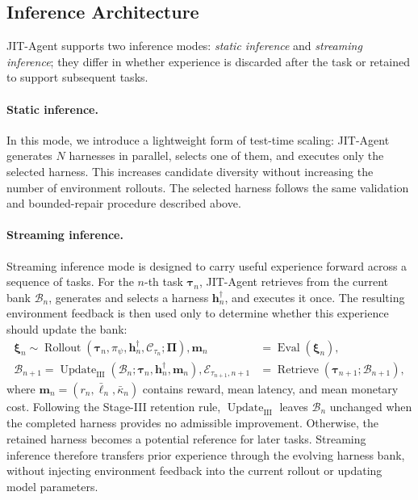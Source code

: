 \documentclass{article}
\newcommand{\ourmethod}{JIT-Agent\xspace}
\begin{document}
\vspace{-0.5em}
\subsection{Inference Architecture}
\vspace{-0.5em}

\ourmethod supports two inference modes: \textit{static inference} and \textit{streaming inference}; they differ in whether experience is discarded after the task or retained to support subsequent tasks.

\vspace{-0.7em}
\paragraph{Static inference.}
In this mode, we introduce a lightweight form of test-time scaling: \ourmethod generates $N$ harnesses in parallel, selects one of them, and executes only the selected harness. This increases candidate diversity without increasing the number of environment rollouts. The selected harness follows the same validation and bounded-repair procedure described above.

\vspace{-0.7em}
\paragraph{Streaming inference.}
Streaming inference mode is designed to carry useful experience forward across a sequence of tasks. For the $n$-th task $\boldsymbol{\tau}_n$, \ourmethod retrieves from the current bank $\mathcal{B}_n$, generates and selects a harness $\mathbf{h}^{\dagger}_n$, and executes it once. The resulting environment feedback is then used only to determine whether this experience should update the bank:
\begin{equation}
\label{eq:streaming_inference}
\begin{aligned}
\boldsymbol{\xi}_{n}
\sim \operatorname{Rollout}(\boldsymbol{\tau}_n,\pi_{\psi},\mathbf{h}^{\dagger}_{n},\mathcal{C}_{\tau_n};\boldsymbol{\Pi}),
\mathbf{m}_{n}
&= \operatorname{Eval}(\boldsymbol{\xi}_{n}), \\
\mathcal{B}_{n+1}
= \operatorname{Update}_{\mathrm{III}}
(\mathcal{B}_{n};\boldsymbol{\tau}_n,\mathbf{h}^{\dagger}_{n},\mathbf{m}_{n}),
\mathcal{E}_{\tau_{n+1},n+1}
&= \operatorname{Retrieve}
(\boldsymbol{\tau}_{n+1};\mathcal{B}_{n+1}),
\end{aligned}
\end{equation}
where $\mathbf{m}_{n}=(r_n,\bar\ell_n,\bar\kappa_n)$ contains reward, mean latency, and mean monetary cost. Following the Stage-III retention rule, $\operatorname{Update}_{\mathrm{III}}$ leaves $\mathcal{B}_n$ unchanged when the completed harness provides no admissible improvement. Otherwise, the retained harness becomes a potential reference for later tasks. Streaming inference therefore transfers prior experience through the evolving harness bank, without injecting environment feedback into the current rollout or updating model parameters.
\end{document}
